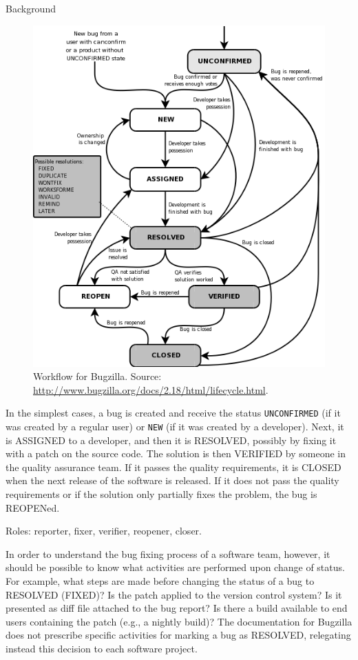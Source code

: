 \begin{section}{Background}
\begin{figure}[ht]
	\centering
		\includegraphics[scale=0.4]{bugzilla.png}
	\caption{Workflow for Bugzilla. Source: \url{http://www.bugzilla.org/docs/2.18/html/lifecycle.html}.}
	\label{fig:bugzilla}
\end{figure}

In the simplest cases, a bug is created and receive the status \texttt{UNCONFIRMED} (if it was created by a regular user) or \texttt{NEW} (if it was created by a developer). Next, it is ASSIGNED to a developer, and then it is RESOLVED, possibly by fixing it with a patch on the source code. The solution is then VERIFIED by someone in the quality assurance team. If it passes the quality requirements, it is CLOSED when the next release of the software is released. If it does not pass the quality requirements or if the solution only partially fixes the problem, the bug is REOPENed.

\TODO Roles: reporter, fixer, verifier, reopener, closer.

In order to understand the bug fixing process of a software team, however, it should be possible to know what activities are performed upon change of status. For example, what steps are made before changing the status of a bug to RESOLVED (FIXED)? Is the patch applied to the version control system? Is it presented as diff file attached to the bug report? Is there a build available to end users containing the patch (e.g., a nightly build)? The documentation for Bugzilla does not prescribe specific activities for marking a bug as RESOLVED, relegating instead this decision to each software project.


\end{section}
